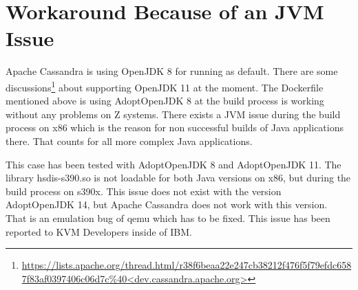 \section{Workaround Because of an JVM Issue}

Apache Cassandra is using OpenJDK 8 for running as default. There are some discussions\footnote{\url{https://lists.apache.org/thread.html/r38f6beaa22e247cb38212f476f5f79efdc6587f83af0397406c06d7c\%40<dev.cassandra.apache.org>}} about supporting OpenJDK 11 at the moment. The Dockerfile mentioned above is using AdoptOpenJDK 8 at the build process is working without any problems on Z systems. There exists a JVM issue during the build process on x86 which is the reason for non successful builds of Java applications there. That counts for all more complex Java applications.


This case has been tested with AdoptOpenJDK 8 and AdoptOpenJDK 11. The library hsdis-s390.so is not loadable for both Java versions on x86, but during the build process on s390x. This issue does not exist with the version AdoptOpenJDK 14, but Apache Cassandra does not work with this version. \\
That is an emulation bug of qemu which has to be fixed. This issue has been reported to KVM Developers inside of IBM. 

